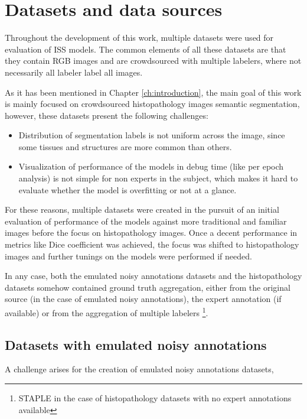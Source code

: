 \section{Datasets and data sources}

Throughout the development of this work, multiple datasets were used
for evaluation of \gls{ISS} models. The common elements of all these datasets
are that they contain RGB images and are crowdsourced with multiple
labelers, where not necessarily all labeler label all images.

As it has been mentioned in Chapter \ref{ch:introduction}, the main goal of this
work is mainly focused on crowdsourced histopathology images semantic
segmentation, however, these datasets present the following challenges:

\begin{itemize}
  \item Distribution of segmentation labels is not uniform across the
    image, since some tissues and structures are more common than others.
  \item Visualization of performance of the models in debug time (like per epoch
    analysis) is not simple for non experts in the subject, which makes it
    hard to evaluate whether the model is overfitting or not at a glance.
\end{itemize}

For these reasons, multiple datasets were created in the pursuit of
an initial evaluation of performance of the models against more traditional
and familiar images before the focus on histopathology images. Once a
decent performance in metrics like Dice coefficient was achieved, the
focus was shifted to histopathology images and further tunings on the models
were performed if needed.

In any case, both the emulated noisy annotations datasets and the
histopathology datasets somehow contained ground truth aggregation, either from
the original source (in the case of emulated noisy annotations), the
expert annotation (if available) or from the aggregation of multiple
labelers \footnote{\gls{STAPLE} in the case of histopathology
datasets with no expert annotations available}.

\subsection{Datasets with emulated noisy annotations}

A challenge arises for the creation of emulated noisy annotations datasets,